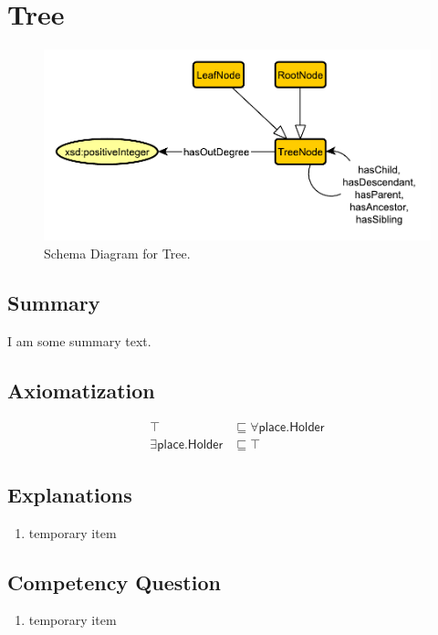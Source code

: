 \section{Tree}
\label{sec:Tree}
\begin{figure}[h!]
\begin{center}
\includegraphics[width=.8\textwidth]{figures/tree}
\end{center}
\caption{Schema Diagram for Tree.}
\label{fig:Tree}
\end{figure}
\subsection{Summary}
\label{sum:Tree}
I am some summary text.

\subsection{Axiomatization}
\label{axs:Tree}
\begin{align}
\top &\sqsubseteq \forall\textsf{place.Holder} \\ 
\exists\textsf{place.Holder} &\sqsubseteq \top 
\end{align}

\subsection{Explanations}
\label{exp:Tree}
\begin{enumerate}
\item temporary item
\end{enumerate}

\subsection{Competency Question}
\label{cqs:Tree}
\begin{enumerate}[CQ1.]
\item temporary item
\end{enumerate}

\newpage
